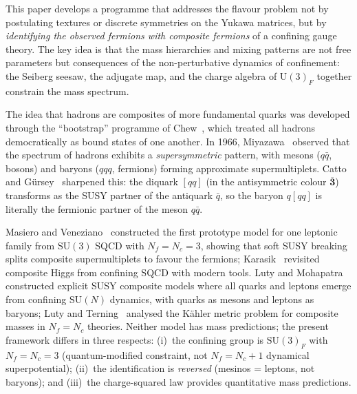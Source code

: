 \documentclass[aps,prd,twocolumn,showpacs,preprintnumbers,superscriptaddress,floatfix]{revtex4-2}
\newcommand{\SU}{\mathrm{SU}}
\newcommand{\UU}{\mathrm{U}}
\newcommand{\Nf}{N_{\!f}}
\newcommand{\Nc}{N_{\!c}}
\begin{document}
This paper develops a programme that addresses the flavour
problem not by postulating textures or discrete symmetries on the
Yukawa matrices, but by \emph{identifying the observed fermions
with composite fermions} of a confining gauge theory.
The key idea is that the mass hierarchies and mixing patterns are
not free parameters but consequences of the non-perturbative
dynamics of confinement: the Seiberg seesaw, the adjugate map,
and the charge algebra of $\UU(3)_F$ together constrain the
mass spectrum.

The idea that hadrons are composites of more fundamental quarks
was developed through the ``bootstrap'' programme of
Chew~\cite{Chew:1962}, which treated all hadrons
democratically as bound states of one another.
In 1966, Miyazawa~\cite{Miyazawa:1966} observed that the
spectrum of hadrons exhibits a \emph{supersymmetric} pattern,
with mesons ($q\bar{q}$, bosons) and baryons ($qqq$, fermions)
forming approximate supermultiplets.
Catto and G\"ursey~\cite{CattoGursey:1985} sharpened this: the
diquark $[qq]$ (in the antisymmetric colour
$\overline{\mathbf{3}}$) transforms as the SUSY partner of the
antiquark $\bar{q}$, so the baryon $q[qq]$ is literally the
fermionic partner of the meson $q\bar{q}$.

Masiero and Veneziano~\cite{MasieroVeneziano:1985} constructed
the first prototype model for one leptonic family from
$\SU(3)$ SQCD with $\Nf = \Nc = 3$, showing that soft SUSY
breaking splits composite supermultiplets to favour the
fermions; Karasik~\cite{Karasik:2020} revisited composite Higgs
from confining SQCD with modern tools.
Luty and Mohapatra~\cite{LutyMohapatra:1997} constructed
explicit SUSY composite models where all quarks and leptons
emerge from confining $\SU(N)$ dynamics, with quarks as mesons
and leptons as baryons;
Luty and Terning~\cite{LutyTerning:2000} analysed the
K\"ahler metric problem for composite masses in
$\Nf = \Nc$ theories.
Neither model has mass predictions; the present framework
differs in three respects: (i)~the confining group is
$\SU(3)_F$ with $\Nf = \Nc = 3$ (quantum-modified constraint,
not $\Nf = \Nc + 1$ dynamical superpotential); (ii)~the
identification is \emph{reversed} (mesinos = leptons, not
baryons); and (iii)~the charge-squared law provides
quantitative mass predictions.
\end{document}
